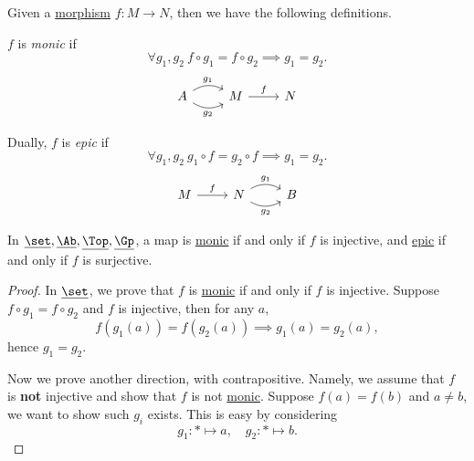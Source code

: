 \begin{definition*}
	Given a \hyperref[def:morphism]{morphism} \(f\colon M\to N\), then we have the following definitions.
	\begin{definition}[Monic]\label{def:monic}
		\(f\) is \emph{monic} if
		\[
			\forall g_1, g_2\ f\circ g_1 = f\circ g_2 \implies g_1 = g_2.
		\]
		\[
			\begin{tikzcd}
				A\ar[r, bend left, "g_1"]\ar[r, bend right, "g_2"']& M \ar[r, "f"]& N
			\end{tikzcd}
		\]
	\end{definition}

	\begin{definition}[Epic]\label{def:epic}
		Dually, \(f\) is \emph{epic} if
		\[
			\forall g_1, g_2\ g_{1} \circ f = g_2 \circ f \implies g_1 = g_2.
		\]
		\[
			\begin{tikzcd}
				M\ar[r, "f"]& N\ar[r, bend left, "g_1"]\ar[r, bend right, "g_2"']& B
			\end{tikzcd}
		\]
	\end{definition}
\end{definition*}

\begin{lemma}
	In \(\underline{\set}, \underline{\Ab}, \underline{\Top}, \underline{\Gp}\), a map is \hyperref[def:monic]{monic} if and only
	if \(f\) is injective, and \hyperref[def:epic]{epic} if and only if \(f\) is surjective.
\end{lemma}
\begin{proof}
	In \(\underline{\set}\), we prove that \(f\) is \hyperref[def:monic]{monic} if and only if \(f\) is injective. Suppose
	\(f\circ g_1 = f\circ g_2\) and \(f\) is injective, then for any \(a\),
	\[
		f(g_1(a)) = f(g_2(a))\implies g_1(a) = g_2(a),
	\]
	hence \(g_1 = g_2\).

	\par Now we prove another direction, with contrapositive. Namely, we assume that \(f\) is \textbf{not} injective and show that
	\(f\) is not \hyperref[def:monic]{monic}. Suppose \(f(a) = f(b)\) and \(a\neq b\), we want to show such \(g_{i}\) exists. This is easy by considering
	\[
		g_1\colon \ast\mapsto a,\quad g_2\colon \ast\mapsto b.
	\]
\end{proof}

